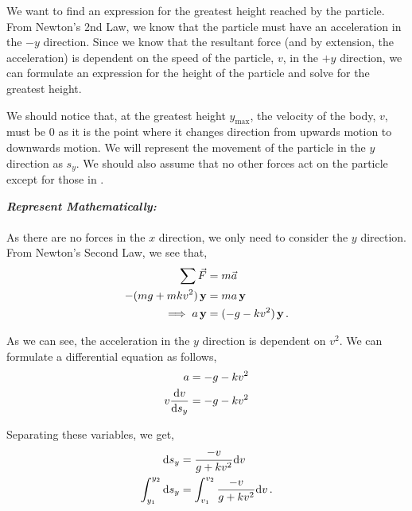 \begin{subquestions}
We want to find an expression for the greatest height reached by the particle. From Newton's 2nd Law, we know that the particle must have an acceleration in the $-y$ direction. Since we know that the resultant force (and by extension, the acceleration) is dependent on the speed of the particle, $v$, in the $+y$ direction, we can formulate an expression for the height of the particle and solve for the greatest height.

We should notice that, at the greatest height $y_{\text{max}}$, the velocity of the body, $v$, must be 0 as it is the point where it changes direction from upwards motion to downwards motion.
We will represent the movement of the particle in the $y$ direction as $s_y$.
We should also assume that no other forces act on the particle except for those in . 




\textbf{\textit{Represent Mathematically:}} \\ \\
As there are no forces in the $x$ direction, we only need to consider the $y$ direction. From Newton's Second Law, we see that,
\begin{align}
	\sum \vec{F} & = m\vec{a} \nonumber \\
	-(mg+mkv^2) \,\mathbf{y} & = ma \,\mathbf{y} \nonumber \\
	\implies a \,\mathbf{y} & = (-g -kv^2)\,\mathbf{y} \,.
\end{align}

As we can see, the acceleration in the $y$ direction is dependent on $v^2$. We can formulate a differential equation as follows,
\begin{align}
	a & = -g -kv^2 \nonumber \\
	v \frac{\mathrm{d}v}{\mathrm{d}s_y} & = -g - kv^2 \nonumber \\
\end{align}

Separating these variables, we get,
\begin{align}
	\mathrm{d} s_y & = \frac{-v}{g+kv^2}\mathrm{d} v \nonumber \\
	\int_{y_1}^{y_2} \mathrm{d} s_y & = \int_{v_1}^{v_2} \frac{-v}{g+kv^2}\mathrm{d} v \,.
\end{align}





\end{subquestions}
